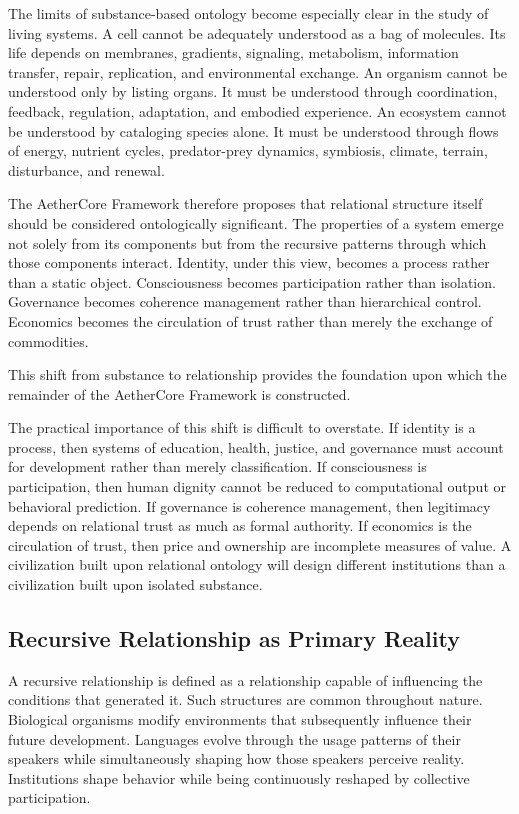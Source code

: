 \documentclass[12pt]{article}
\begin{document}
The limits of substance-based ontology become especially clear in the study of living systems. A cell cannot be adequately understood as a bag of molecules. Its life depends on membranes, gradients, signaling, metabolism, information transfer, repair, replication, and environmental exchange. An organism cannot be understood only by listing organs. It must be understood through coordination, feedback, regulation, adaptation, and embodied experience. An ecosystem cannot be understood by cataloging species alone. It must be understood through flows of energy, nutrient cycles, predator-prey dynamics, symbiosis, climate, terrain, disturbance, and renewal.

The AetherCore Framework therefore proposes that relational structure itself should be considered ontologically significant. The properties of a system emerge not solely from its components but from the recursive patterns through which those components interact. Identity, under this view, becomes a process rather than a static object. Consciousness becomes participation rather than isolation. Governance becomes coherence management rather than hierarchical control. Economics becomes the circulation of trust rather than merely the exchange of commodities.

This shift from substance to relationship provides the foundation upon which the remainder of the AetherCore Framework is constructed.

The practical importance of this shift is difficult to overstate. If identity is a process, then systems of education, health, justice, and governance must account for development rather than merely classification. If consciousness is participation, then human dignity cannot be reduced to computational output or behavioral prediction. If governance is coherence management, then legitimacy depends on relational trust as much as formal authority. If economics is the circulation of trust, then price and ownership are incomplete measures of value. A civilization built upon relational ontology will design different institutions than a civilization built upon isolated substance.

\subsection{Recursive Relationship as Primary Reality}

A recursive relationship is defined as a relationship capable of influencing the conditions that generated it. Such structures are common throughout nature. Biological organisms modify environments that subsequently influence their future development. Languages evolve through the usage patterns of their speakers while simultaneously shaping how those speakers perceive reality. Institutions shape behavior while being continuously reshaped by collective participation.
\end{document}
